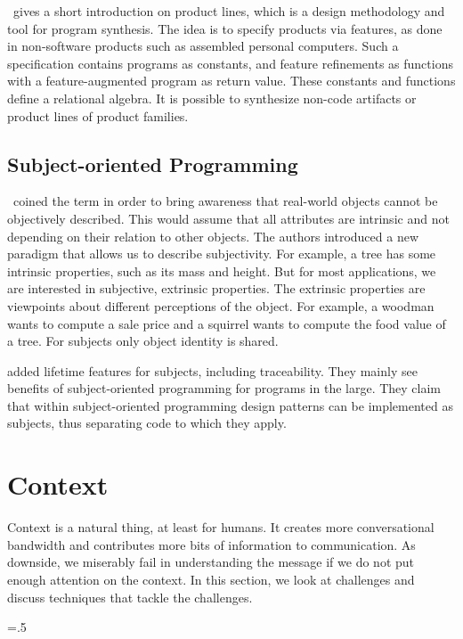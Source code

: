 \citet{batory2003tutorial}~gives a short introduction on product lines, which is a design methodology and tool for program synthesis.
The idea is to specify products via features, as done in non-software products such as assembled personal computers.
Such a specification contains programs as constants, and feature refinements as functions with a feature-augmented program as return value.
These constants and functions define a relational algebra.
It is possible to synthesize non-code artifacts or product lines of product families.

\subsection{Subject-oriented Programming}

\citet{harrison1993subject}~coined the term  in order to bring awareness that real-world objects cannot be objectively described.
This would assume that all attributes are intrinsic and not depending on their relation to other objects.
The authors introduced a new paradigm that allows us to describe subjectivity.
For example, a tree has some intrinsic properties, such as its mass and height.
But for most applications, we are interested in subjective, extrinsic properties.
The extrinsic properties are viewpoints about different perceptions of the object.
For example, a woodman wants to compute a sale price and a squirrel wants to compute the food value of a tree.
For subjects only object identity is shared.

\citet{ossher1999using} added lifetime features for subjects, including traceability.
They mainly see benefits of subject-oriented programming for programs in the large.
They claim that within subject-oriented programming design patterns can be implemented as subjects, thus separating code to which they apply.














\section {Context}

Context is a natural thing, at least for humans.
It creates more conversational bandwidth and contributes more bits of information to communication.
As downside, we miserably fail in understanding the message if we do not put enough attention on the context.
In this section, we look at challenges and discuss techniques that tackle the challenges.%
{\parfillskip=0pt \emergencystretch=.5\textwidth \par}

